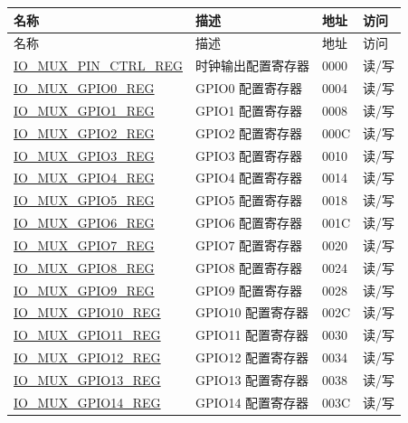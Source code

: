 \documentclass[main.tex]{subfiles}
\begin{document}
\begin{longtable}{ | p{5cm} | p{7.5cm} | p{2cm} | p{1cm} | }
\hline\rowcolor{lightgray}
名称 & 描述 &  地址 & 访问 \\ \hline
 \hline
        \endfirsthead
        \hline
        \rowcolor{lightgray}
名称 & 描述 &  地址 & 访问 \\
        \hline
        \endhead
        \endfoot
\hyperref[regdesc:IOMUXPINCTRL]{IO\_MUX\_PIN\_CTRL\_REG}& 时钟输出配置寄存器 & \hexprefix{}0000 & 读/写 \\\hline
\hyperref[regdesc:IOMUXnREG]{IO\_MUX\_GPIO0\_REG} & GPIO0 配置寄存器 & \hexprefix{}0004 &读/写\\ \hline
\hyperref[regdesc:IOMUXnREG]{IO\_MUX\_GPIO1\_REG} & GPIO1 配置寄存器 & \hexprefix{}0008 & 读/写 \\ \hline
\hyperref[regdesc:IOMUXnREG]{IO\_MUX\_GPIO2\_REG} & GPIO2 配置寄存器 & \hexprefix{}000C & 读/写 \\ \hline
\hyperref[regdesc:IOMUXnREG]{IO\_MUX\_GPIO3\_REG} & GPIO3 配置寄存器 & \hexprefix{}0010 & 读/写 \\ \hline
\hyperref[regdesc:IOMUXnREG]{IO\_MUX\_GPIO4\_REG} & GPIO4 配置寄存器 & \hexprefix{}0014 & 读/写\\ \hline
\hyperref[regdesc:IOMUXnREG]{IO\_MUX\_GPIO5\_REG} & GPIO5 配置寄存器 & \hexprefix{}0018 & 读/写 \\ \hline
\hyperref[regdesc:IOMUXnREG]{IO\_MUX\_GPIO6\_REG} & GPIO6 配置寄存器 & \hexprefix{}001C &读/写 \\ \hline
\hyperref[regdesc:IOMUXnREG]{IO\_MUX\_GPIO7\_REG} & GPIO7 配置寄存器 & \hexprefix{}0020 & 读/写 \\ \hline
\hyperref[regdesc:IOMUXnREG]{IO\_MUX\_GPIO8\_REG} & GPIO8 配置寄存器 & \hexprefix{}0024 & 读/写 \\ \hline
\hyperref[regdesc:IOMUXnREG]{IO\_MUX\_GPIO9\_REG} & GPIO9 配置寄存器 & \hexprefix{}0028 & 读/写 \\ \hline
\hyperref[regdesc:IOMUXnREG]{IO\_MUX\_GPIO10\_REG} & GPIO10 配置寄存器 & \hexprefix{}002C & 读/写 \\ \hline
\hyperref[regdesc:IOMUXnREG]{IO\_MUX\_GPIO11\_REG} & GPIO11 配置寄存器 & \hexprefix{}0030 & 读/写 \\ \hline
\hyperref[regdesc:IOMUXnREG]{IO\_MUX\_GPIO12\_REG} & GPIO12 配置寄存器 & \hexprefix{}0034 & 读/写 \\ \hline
\hyperref[regdesc:IOMUXnREG]{IO\_MUX\_GPIO13\_REG} & GPIO13 配置寄存器 & \hexprefix{}0038 & 读/写 \\ \hline
\hyperref[regdesc:IOMUXnREG]{IO\_MUX\_GPIO14\_REG} & GPIO14 配置寄存器 & \hexprefix{}003C & 读/写 \\ \hline

\end{longtable}
\end{document}
